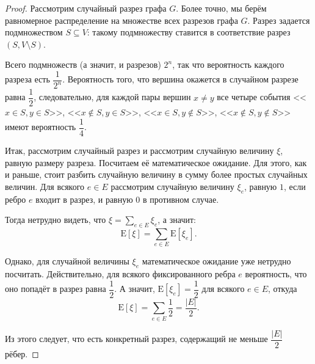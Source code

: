 \documentclass[a4paper]{article}
\theoremstyle{named}
\newcommand{\E}{\text{E}}
\begin{document}
\begin{colloq}
        \begin{proof}
            Рассмотрим случайный разрез графа $G$. Более точно, мы берём равномерное распределение на множестве всех разрезов графа $G$.  Разрез задается подмножеством $S \subseteq V$: такому подмножеству ставится в соответствие разрез $(S, V \setminus S)$.

            Всего подмножеств (а значит, и разрезов) $2^n$, так что вероятность каждого разреза есть $\dfrac{1}{2^n}$. Вероятность того, что вершина окажется в случайном разрезе равна $\dfrac{1}{2}$, следовательно, для каждой пары вершин $x \neq y$ все четыре события <<$x \in S, y \in S$>>, <<$x \notin S, y \in S$>>, <<$x \in S, y \notin S$>>, <<$x \notin S, y \notin S$>> имеют вероятность $\dfrac{1}{4}$.

            Итак, рассмотрим случайный разрез и рассмотрим случайную величину $\xi$, равную размеру разреза. Посчитаем её математическое ожидание. Для этого, как и раньше, стоит разбить случайную величину в сумму более простых случайных величин. Для всякого $e \in E$ рассмотрим случайную величину $\xi_e$, равную $1$, если ребро $e$ входит в разрез, и равную $0$ в противном случае.
            
            Тогда нетрудно видеть, что $\xi = \sum_{e \in E} \xi_e$, а значит:
            \begin{equation*}
                \E[\xi] = \sum_{e \in E} \E[\xi_e].
            \end{equation*}

            Однако, для случайной величины $\xi_e$ математическое ожидание уже нетрудно посчитать. Действительно, для всякого фиксированного ребра $e$ вероятность, что оно попадёт в разрез равна $\dfrac{1}{2}$. А значит, $\E[\xi_e] = \dfrac{1}{2}$ для всякого $e \in E$, откуда
            \begin{equation*}
                \E[\xi] = \sum_{e \in E} \dfrac{1}{2} = \dfrac{|E|}{2}.
            \end{equation*}

            Из этого следует, что есть конкретный разрез, содержащий не меньше $\dfrac{|E|}{2}$ рёбер.
        \end{proof}


\end{colloq}
\end{document}
